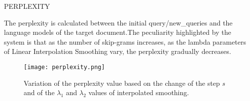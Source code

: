 \begin{frame}{PERPLEXITY}
    \begin{minipage}{\linewidth}
        \centering
        \begin{minipage}{0.35\linewidth}
            The perplexity is calculated 
            between the initial 
            query/new\_queries and the language 
            models of the target document.The peculiarity 
            highlighted by the 
            system is that as the 
            number of skip-grams increases, 
            as the lambda parameters 
            of Linear Interpolation 
            Smoothing vary, 
            the perplexity gradually 
            decreases.
        \end{minipage}
        \hspace{0.01\linewidth}
        \begin{minipage}{0.55\linewidth}
            \begin{figure}[H]
                \centering
                \texttt{[image: perplexity.png]}
                \centering
                \caption{Variation of the perplexity value based on the change of the step \emph{s} and of the $\lambda_1$ and $\lambda_2$ values of interpolated smoothing.}
                \label{perplexity}
            \end{figure}
        \end{minipage}
    \end{minipage}
\end{frame}

